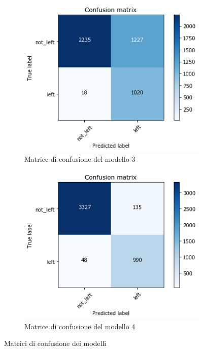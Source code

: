 \documentclass[a4paper]{article}
\begin{document}
\begin{figure}[h]
\begin{subfigure}[b]{.45\linewidth}
\includegraphics[width=\linewidth]{modello3Conf}
\caption{Matrice di confusione del modello 3}\label{subfig:conf3}
\end{subfigure}
\begin{subfigure}[b]{.45\linewidth}
\includegraphics[width=\linewidth]{modello4Conf}
\caption{Matrice di confusione del modello 4}\label{subfig:conf4}
\end{subfigure}
\caption{Matrici di confusione dei modelli}
\label{fig:confusions}
\end{figure}
\end{document}
